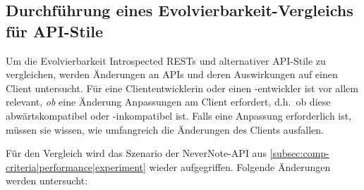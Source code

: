 \subsection{Durchführung eines Evolvierbarkeit-Vergleichs für API-Stile}\label{subsec:comp-criteria|evolvability|experiment}
Um die Evolvierbarkeit Introspected RESTs und alternativer API-Stile zu vergleichen, werden Änderungen an APIs und deren Auswirkungen auf einen Client untersucht. Für eine Cliententwicklerin oder einen -entwickler ist vor allem relevant, \emph{ob} eine Änderung Anpassungen am Client erfordert, d.h.\, ob diese abwärtskompatibel oder -inkompatibel ist. Falls eine Anpassung erforderlich ist, müssen sie wissen, wie umfangreich die Änderungen des Clients ausfallen.

\para{}Für den Vergleich wird das Szenario der NeverNote-API aus \cref{subsec:comp-criteria|performance|experiment} wieder aufgegriffen. Folgende Änderungen werden untersucht:

